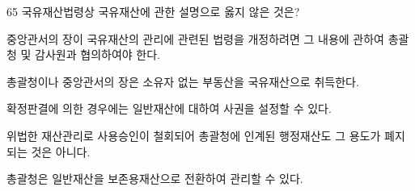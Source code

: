 \begin{question}{65}
국유재산법령상 국유재산에 관한 설명으로 옳지 않은 것은?
\begin{choices}
  \item 중앙관서의 장이 국유재산의 관리에 관련된 법령을 개정하려면 그 내용에 관하여 총괄청 및 감사원과 협의하여야 한다.
  \item 총괄청이나 중앙관서의 장은 소유자 없는 부동산을 국유재산으로 취득한다.
  \item 확정판결에 의한 경우에는 일반재산에 대하여 사권을 설정할 수 있다.
  \item 위법한 재산관리로 사용승인이 철회되어 총괄청에 인계된 행정재산도 그 용도가 폐지되는 것은 아니다.
  \item 총괄청은 일반재산을 보존용재산으로 전환하여 관리할 수 있다.
\end{choices}
\end{question}
